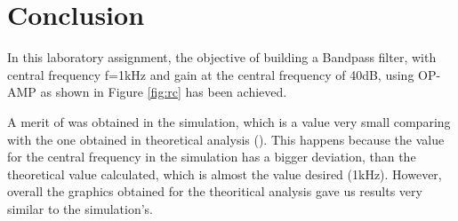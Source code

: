 \section{Conclusion}
\label{sec:conclusion}
In this laboratory assignment, the objective of building a Bandpass filter, with central frequency f=1kHz and gain at the central frequency of 40dB, using OP-AMP as shown in Figure \ref{fig:rc} has been achieved.

A merit of  was obtained in the simulation, which is a  value very small comparing with the one obtained in theoretical analysis (). This happens because the value for the central frequency  in the simulation has a bigger deviation, than the theoretical value calculated, which is almost the value desired (1kHz). However, overall the graphics obtained for the theoritical analysis gave us results very similar to the simulation's.








